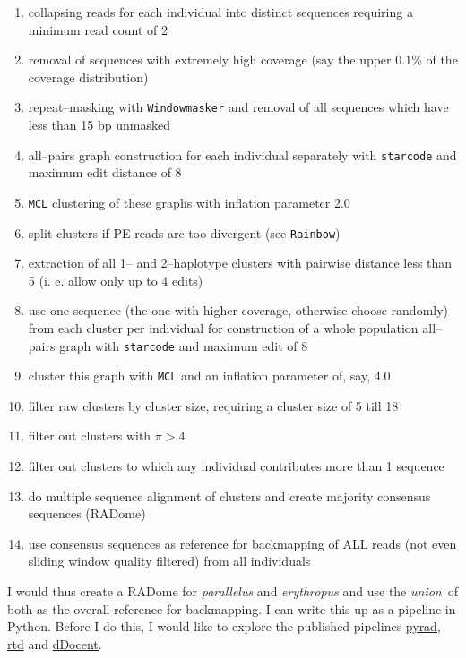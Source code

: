 \documentclass{article}\usepackage[]{graphicx}\usepackage[]{color}
\begin{document}
\begin{enumerate}
\item collapsing reads for each individual into distinct sequences requiring a minimum read count of 2
\item removal of sequences with extremely high coverage (say the upper 0.1\% of the coverage distribution)
\item repeat--masking with \texttt{Windowmasker} and removal of all sequences which have less than 15 bp unmasked
\item all--pairs graph construction for each individual separately with \texttt{starcode} and maximum edit distance of 8 
\item \texttt{MCL} clustering of these graphs with inflation parameter 2.0
\item split clusters if PE reads are too divergent (see \texttt{Rainbow})
\item extraction of all 1-- and 2--haplotype clusters with pairwise distance less than 5 (i. e. allow only up to 4 edits)
\item use one sequence (the one with higher coverage, otherwise choose randomly) from each cluster per individual for construction of a whole population all--pairs graph with \texttt{starcode} and maximum edit of 8
\item cluster this graph with \texttt{MCL} and an inflation parameter of, say, 4.0
\item filter raw clusters by cluster size, requiring a cluster size of 5 till 18
\item filter out clusters with $\pi>4$
\item filter out clusters to which any individual contributes more than 1 sequence
\item do multiple sequence alignment of clusters and create majority consensus sequences (RADome)
\item use consensus sequences as reference for backmapping of ALL reads (not even sliding window quality filtered) from all individuals
\end{enumerate}

I would thus create a RADome for \textit{parallelus} and \textit{erythropus} and use the \emph{union}~of both as the overall reference for backmapping. I can write this up as a pipeline in Python. Before I do this, I would like to explore the published pipelines \href{http://dereneaton.com/software/pyrad/}{pyrad}, \href{https://github.com/brantp/rtd}{rtd} and \href{https://ddocent.wordpress.com/ddocent-pipeline-user-guide/}{dDocent}.
\newline\newline
\end{document}
